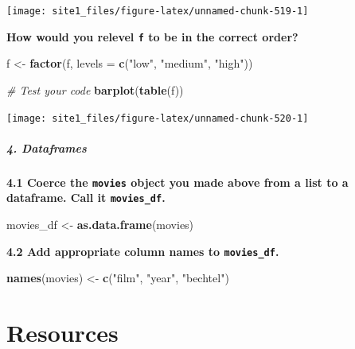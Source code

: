 \documentclass[]{book}
\newenvironment{Shaded}{\begin{snugshade}}{\end{snugshade}}
\newcommand{\CommentTok}[1]{\textcolor[rgb]{0.56,0.35,0.01}{\textit{#1}}}
\newcommand{\DataTypeTok}[1]{\textcolor[rgb]{0.13,0.29,0.53}{#1}}
\newcommand{\KeywordTok}[1]{\textcolor[rgb]{0.13,0.29,0.53}{\textbf{#1}}}
\newcommand{\NormalTok}[1]{#1}
\newcommand{\StringTok}[1]{\textcolor[rgb]{0.31,0.60,0.02}{#1}}
\begin{document}
\begin{center}\texttt{[image: site1\_files/figure-latex/unnamed-chunk-519-1]} \end{center}

\textbf{How would you relevel \texttt{f} to be in the correct order?}

\begin{Shaded}
\begin{Highlighting}[]
\NormalTok{f <-}\StringTok{ }\KeywordTok{factor}\NormalTok{(f, }\DataTypeTok{levels =} \KeywordTok{c}\NormalTok{(}\StringTok{"low"}\NormalTok{, }\StringTok{"medium"}\NormalTok{, }\StringTok{"high"}\NormalTok{))}

\CommentTok{# Test your code}
\KeywordTok{barplot}\NormalTok{(}\KeywordTok{table}\NormalTok{(f))}
\end{Highlighting}
\end{Shaded}

\begin{center}\texttt{[image: site1\_files/figure-latex/unnamed-chunk-520-1]} \end{center}

\hypertarget{dataframes-1}{%
\subsubsection*{4. Dataframes}\label{dataframes-1}}

\textbf{4.1 Coerce the \texttt{movies} object you made above from a list to a dataframe. Call it \texttt{movies\_df}.}

\begin{Shaded}
\begin{Highlighting}[]
\NormalTok{movies_df <-}\StringTok{ }\KeywordTok{as.data.frame}\NormalTok{(movies)}
\end{Highlighting}
\end{Shaded}

\textbf{4.2 Add appropriate column names to \texttt{movies\_df}.}

\begin{Shaded}
\begin{Highlighting}[]
\KeywordTok{names}\NormalTok{(movies) <-}\StringTok{ }\KeywordTok{c}\NormalTok{(}\StringTok{"film"}\NormalTok{, }\StringTok{"year"}\NormalTok{, }\StringTok{"bechtel"}\NormalTok{)}
\end{Highlighting}
\end{Shaded}

\hypertarget{part-resources}{%
\part{Resources}\label{part-resources}}
\end{document}
